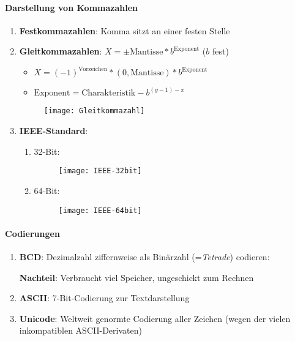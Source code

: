 \paragraph{Darstellung von Kommazahlen}
\begin{enumerate}
	\item \textbf{Festkommazahlen}: Komma sitzt an einer festen Stelle

	\item \textbf{Gleitkommazahlen}: $X = \pm \text{Mantisse}*b^{\text{Exponent}}$ ($b$ fest)
	\begin{itemize}
		\item $X = (-1)^{\text{Vorzeichen}}*(0,\text{Mantisse})*b^{\text{Exponent}}$
		\item $\text{Exponent} = \text{Charakteristik}-b^{(y-1)-x}$
	\end{itemize}
	\begin{figure}[ht]
	  \centering
	  \texttt{[image: Gleitkommazahl]}
	  \label{Gleitkommazahl}
	\end{figure}

	\item \textbf{IEEE-Standard}:
	\begin{enumerate}
		\item 32-Bit:
			\begin{figure}[ht]
			  \centering
			  \texttt{[image: IEEE-32bit]}
			  \label{IEEE-32bit}
			\end{figure}
		\item 64-Bit:
			\begin{figure}[ht]
			  \centering
			  \texttt{[image: IEEE-64bit]}
			  \label{IEEE-64bit}
			\end{figure}
	\end{enumerate}
\end{enumerate}

\paragraph{Codierungen}
\begin{enumerate}
	\item \textbf{BCD}: Dezimalzahl ziffernweise als Binärzahl (=\emph{Tetrade}) codieren:
	\begin{center}
	\end{center}
	\textbf{Nachteil}: Verbraucht viel Speicher, ungeschickt zum Rechnen

	\item \textbf{ASCII}: 7-Bit-Codierung zur Textdarstellung

	\item \textbf{Unicode}: Weltweit genormte Codierung aller Zeichen (wegen der vielen inkompatiblen ASCII-Derivaten)
\end{enumerate}